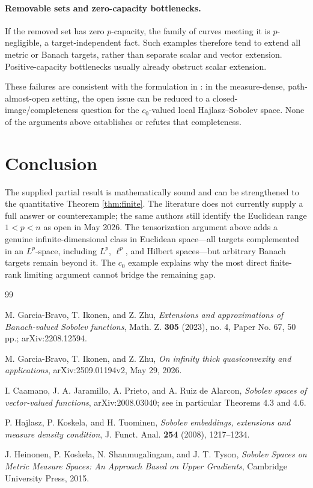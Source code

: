 \documentclass[11pt]{article}
\theoremstyle{remark}
\begin{document}
\paragraph{Removable sets and zero-capacity bottlenecks.}
If the removed set has zero $p$-capacity, the family of curves meeting it is
$p$-negligible, a target-independent fact.  Such examples therefore tend to
extend all metric or Banach targets, rather than separate scalar and vector
extension.  Positive-capacity bottlenecks usually already obstruct scalar
extension.

These failures are consistent with the formulation in \cite{GBIZ23}: in the
measure-dense, path-almost-open setting, the open issue can be reduced to a
closed-image/completeness question for the $c_0$-valued local
Hajlasz--Sobolev space.  None of the arguments above establishes or refutes
that completeness.

\section{Conclusion}

The supplied partial result is mathematically sound and can be strengthened
to the quantitative Theorem \ref{thm:finite}.  The literature does not
currently supply a full answer or counterexample; the same authors still
identify the Euclidean range $1<p<n$ as open in May 2026.  The tensorization
argument above adds a genuine infinite-dimensional class in Euclidean
space---all targets complemented in an $L^p$-space, including $L^p$,
$\ell^p$, and Hilbert spaces---but arbitrary Banach targets remain beyond
it.  The $c_0$ example explains why the most direct finite-rank limiting
argument cannot bridge the remaining gap.

\begin{thebibliography}{99}

M. Garcia-Bravo, T. Ikonen, and Z. Zhu,
\emph{Extensions and approximations of Banach-valued Sobolev functions},
Math. Z. \textbf{305} (2023), no. 4, Paper No. 67, 50 pp.;
arXiv:2208.12594.

M. Garcia-Bravo, T. Ikonen, and Z. Zhu,
\emph{On infinity thick quasiconvexity and applications},
arXiv:2509.01194v2, May 29, 2026.

I. Caamano, J. A. Jaramillo, A. Prieto, and A. Ruiz de Alarcon,
\emph{Sobolev spaces of vector-valued functions},
arXiv:2008.03040; see in particular Theorems 4.3 and 4.6.

P. Hajlasz, P. Koskela, and H. Tuominen,
\emph{Sobolev embeddings, extensions and measure density condition},
J. Funct. Anal. \textbf{254} (2008), 1217--1234.

J. Heinonen, P. Koskela, N. Shanmugalingam, and J. T. Tyson,
\emph{Sobolev Spaces on Metric Measure Spaces: An Approach Based on Upper
Gradients}, Cambridge University Press, 2015.

\end{thebibliography}
\end{document}
